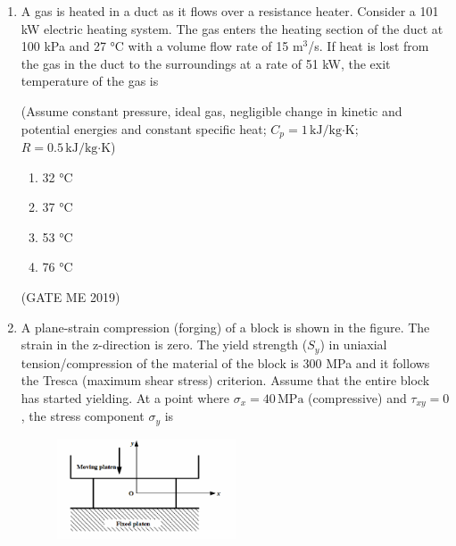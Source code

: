 \documentclass[journal]{IEEEtran}
\begin{document}
\begin{enumerate}
Among the locations P, Q and R, the flow is thermally developed at
\begin{multicols}{4}
\begin{enumerate}
    \item P, Q and R
    \item P and Q only
    \item Q and R only
    \item R only
\end{enumerate}
\end{multicols}
\hfill (GATE ME 2019)

\item A gas is heated in a duct as it flows over a resistance heater. Consider a 101 kW electric heating system. The gas enters the heating section of the duct at 100 kPa and 27 °C with a volume flow rate of 15 m$^3$/s. If heat is lost from the gas in the duct to the surroundings at a rate of 51 kW, the exit temperature of the gas is

(Assume constant pressure, ideal gas, negligible change in kinetic and potential energies and constant specific heat; $ C_p = 1 \, \text{kJ/kg·K} $; $ R = 0.5 \, \text{kJ/kg·K} $)
\begin{multicols}{4}
\begin{enumerate}
    \item 32 °C
    \item 37 °C
    \item 53 °C
    \item 76 °C
\end{enumerate}
\end{multicols}
\hfill (GATE ME 2019)

\item A plane-strain compression (forging) of a block is shown in the figure. The strain in the z-direction is zero. The yield strength ($ S_y $) in uniaxial tension/compression of the material of the block is 300 MPa and it follows the Tresca (maximum shear stress) criterion. Assume that the entire block has started yielding. At a point where $ \sigma_x = 40 \, \text{MPa} $ (compressive) and $ \tau_{xy} = 0 $, the stress component $ \sigma_y $ is

\begin{figure}[H]
\centering
\includegraphics[width=0.5\textwidth]{Fig 11.png}
\caption{}
\label{fig:question34}
\end{figure}


\end{enumerate}
\end{document}

